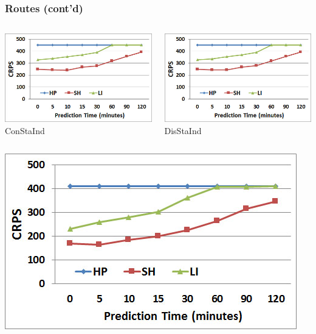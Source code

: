 \documentclass[t]{beamer}
\begin{document}
\begin{frame}\frametitle{Routes \small{(cont'd)}}
\vspace{-0.35in}
\begin{columns}
		\begin{center}
			\includegraphics[scale=0.3]{Approaches_ConStaInd.jpg}\\
			ConStaInd
		\end{center}
		\begin{center}
			\includegraphics[scale=0.3]{Approaches_DisStaInd.jpg}\\
			DisStaInd
		\end{center}
\end{columns}
\begin{columns}
		\begin{center}
			\includegraphics[scale=0.3]{Approaches_DisTimInd.jpg}\\

\end{center}
\end{columns}
\end{frame}
\end{document}
